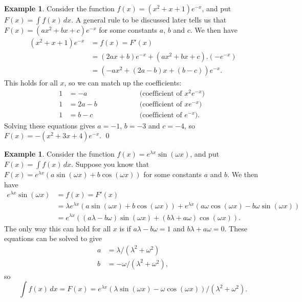 \documentclass[a4paper]{book}
\newcommand{\lm}        {\lambda}
\newcommand{\om}        {\omega}
\renewcommand{\:}{\colon}
\theoremstyle{definition}
\newtheorem{example}[theorem]{Example}
\begin{document}
\begin{example}
 Consider the function $f(x)=(x^2+x+1)e^{-x}$, and put
  $F(x)=\int f(x)\,dx$.  A general rule to be discussed later tells us
 that $F(x)=(ax^2+bx+c)e^{-x}$ for some constants $a$, $b$ and $c$.
 We then have
 \begin{align*}
  (x^2+x+1)e^{-x} &= f(x) = F'(x) \\
    &= (2ax+b) e^{-x} + (ax^2+bx+c).(-e^{-x}) \\
    &= (-ax^2+(2a-b)x+(b-c)) e^{-x}.
 \end{align*}
 This holds for all $x$, so we can match up the coefficients:
 \[ \begin{array}{rlcl}
  1 &= -a   &\hspace{4em}& \text{ (coefficient of $x^2e^{-x}$) } \\
  1 &= 2a-b &            & \text{ (coefficient of $xe^{-x}$) } \\
  1 &= b-c  &            & \text{ (coefficient of $e^{-x}$). }
 \end{array} \]
 Solving these equations gives $a=-1$, $b=-3$ and $c=-4$, so 
 $F(x)=-(x^2+3x+4)e^{-x}$.  \qed
\end{example}
\begin{example}
 Consider the function $f(x)=e^{\lm x}\sin(\om x)$, and put
 $F(x)=\int f(x)\,dx$.  Suppose you know that
 $F(x)=e^{\lm x}(a\sin(\om x)+b\cos(\om x))$ for some constants $a$
 and $b$.  We then have
 \begin{align*}
  e^{\lm x}\sin(\om x) &= f(x) = F'(x) \\
   &= \lm e^{\lm x}(a\sin(\om x)+b\cos(\om x)) +
      e^{\lm x}(a\om\cos(\om x)-b\om\sin(\om x)) \\
   &= e^{\lm x}((a\lm-b\om)\sin(\om x) + 
                (b\lm+a\om)\cos(\om x)).
 \end{align*}
 The only way this can hold for all $x$ is if $a\lm-b\om=1$ and
 $b\lm+a\om=0$.  These equations can be solved to give
 \begin{align*}
  a &= \lm/(\lm^2+\om^2) \\
  b &= -\om/(\lm^2+\om^2),
 \end{align*}
 so 
 \[ \int f(x)\, dx = F(x) = 
     e^{\lm x}(\lm\sin(\om x) - \om\cos(\om x))/(\lm^2+\om^2).
 \]
\end{example}
\end{document}
